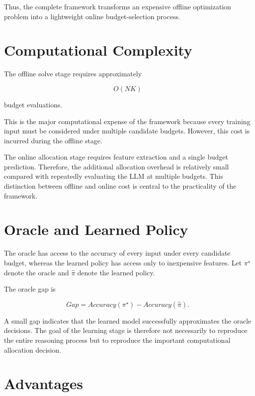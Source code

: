 \documentclass[12pt,a4paper,titlepage]{report}
\begin{document}
Thus, the complete framework transforms an expensive offline optimization problem into a lightweight online budget-selection process.

\section{Computational Complexity}

The offline solve stage requires approximately

\begin{equation}
O(NK)
\end{equation}

budget evaluations.

This is the major computational expense of the framework because every training input must be considered under multiple candidate budgets. However, this cost is incurred during the offline stage.

The online allocation stage requires feature extraction and a single budget prediction. Therefore, the additional allocation overhead is relatively small compared with repeatedly evaluating the LLM at multiple budgets. This distinction between offline and online cost is central to the practicality of the framework.

\section{Oracle and Learned Policy}

The oracle has access to the accuracy of every input under every candidate budget, whereas the learned policy has access only to inexpensive features. Let $\pi^\star$ denote the oracle and $\hat{\pi}$ denote the learned policy.

The oracle gap is

\begin{equation}
Gap
=
Accuracy(\pi^\star)
-
Accuracy(\hat{\pi}).
\end{equation}

A small gap indicates that the learned model successfully approximates the oracle decisions. The goal of the learning stage is therefore not necessarily to reproduce the entire reasoning process but to reproduce the important computational allocation decision.

\section{Advantages}
\end{document}
